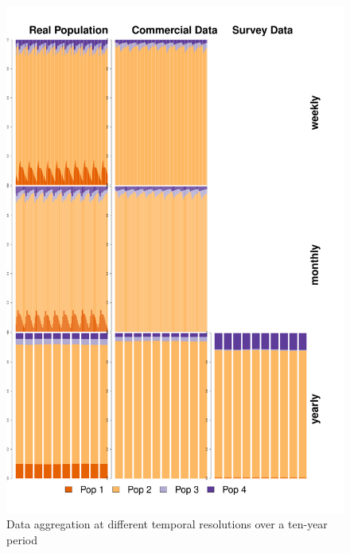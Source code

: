 \documentclass[review]{elsarticle}
\begin{document}
\begin{figure}[!ht]
	\includegraphics[width=\linewidth]{../analysis/Data_Aggregation_time_Rev2}
	\caption{Data aggregation at different temporal resolutions over a
		ten-year period}
	\label{fig:2}
\end{figure}	
\end{document}
